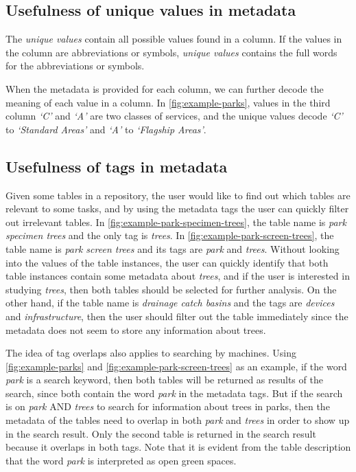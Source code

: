\subsection{Usefulness of unique values in metadata}

The \textit{unique values} contain all possible values found in a column. If the values in the column are abbreviations or symbols, \textit{unique values} contains the full words for the abbreviations or symbols.

When the metadata is provided for each column, we can further decode the meaning of each value in a column. In \autoref{fig:example-parks}, values in the third column \textit{`C'} and \textit{`A'} are two classes of services, and the unique values decode \textit{`C'} to \textit{`Standard Areas'} and \textit{`A'} to \textit{`Flagship Areas'}.

\subsection{Usefulness of tags in metadata}

Given some tables in a repository, the user would like to find out which tables are relevant to some tasks, and by using the metadata tags the user can quickly filter out irrelevant tables. In \autoref{fig:example-park-specimen-trees}, the table name is \textit{park specimen trees} and the only tag is \textit{trees}. In \autoref{fig:example-park-screen-trees}, the table name is \textit{park screen trees} and its tags are \textit{park} and \textit{trees}. Without looking into the values of the table instances, the user can quickly identify that both table instances contain some metadata about \textit{trees}, and if the user is interested in studying \textit{trees}, then both tables should be selected for further analysis. On the other hand, if the table name is \textit{drainage catch basins} and the tags are \textit{devices} and \textit{infrastructure}, then the user should filter out the table immediately since the metadata does not seem to store any information about trees.

The idea of tag overlaps also applies to searching by machines. Using \autoref{fig:example-parks} and \autoref{fig:example-park-screen-trees} as an example, if the word \textit{park} is a search keyword, then both tables will be returned as results of the search, since both contain the word \textit{park} in the metadata tags. But if the search is on \textit{park} AND \textit{trees} to search for information about trees in parks, then the metadata of the tables need to overlap in both \textit{park} and \textit{trees} in order to show up in the search result. Only the second table is returned in the search result because it overlaps in both tags. Note that it is evident from the table description that the word \textit{park} is interpreted as open green spaces.

